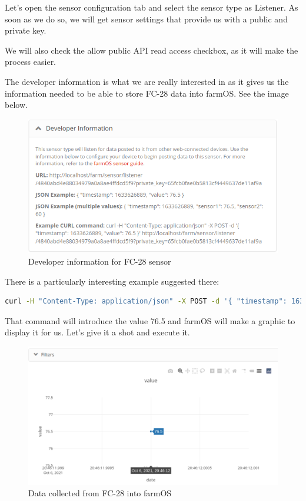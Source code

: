 Let's open the sensor configuration tab and select the sensor type as Listener. As soon as we do so, we will get sensor settings that provide us with a public and private key.

We will also check the allow public API read access checkbox, as it will make the process easier.

The developer information is what we are really interested in as it gives us the information needed to be able to store FC-28 data into farmOS. See the image below.

\begin{figure}[H]
    \centering
    \includegraphics[width=1\textwidth]{fig/drupal-install/developer-info.png}
    \caption{Developer information for FC-28 sensor}
    \label{fig:developer-info}
\end{figure}

There is a particularly interesting example suggested there:
\begin{lstlisting}[language=bash]
    curl -H "Content-Type: application/json" -X POST -d '{ "timestamp": 1633626889, "value": 76.5 }' http://localhost/farm/sensor/listener/4840abd4e88034979a0a8ae4ffdcd5f9?private_key=65fcb0fae0b5813cf4449637de11af9a
\end{lstlisting}

That command will introduce the value 76.5 and farmOS will make a graphic to display it for us. Let's give it a shot and execute it.

\begin{figure}[H]
    \centering
    \includegraphics[width=1\textwidth]{fig/drupal-install/sensor-data-graphic.png}
    \caption{Data collected from FC-28 into farmOS}
    \label{fig:sensor-data-graphic}
\end{figure}

